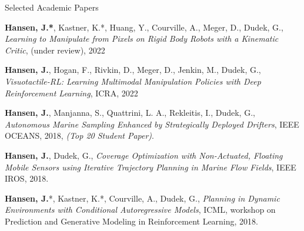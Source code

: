 \documentclass{resume} %
\begin{document}
 \begin{rSection}{Selected Academic Papers}

\textbf{Hansen, J.*}, Kastner, K.*, Huang, Y., Courville, A., Meger, D., Dudek, G., \textit{Learning to Manipulate from Pixels on Rigid Body Robots with a Kinematic Critic}, (under review), 2022

\textbf{Hansen, J.}, Hogan, F., Rivkin, D., Meger, D., Jenkin, M., Dudek, G., \textit{Visuotactile-RL: Learning Multimodal Manipulation Policies with Deep Reinforcement Learning}, ICRA, 2022


\textbf{Hansen, J.}, Manjanna, S.,  Quattrini, L. A., Rekleitis, I., Dudek, G., \textit{Autonomous Marine Sampling Enhanced by Strategically Deployed Drifters}, IEEE OCEANS, 2018, \emph{{(Top 20 Student Paper)}}.

\textbf{Hansen, J.}, Dudek, G., \textit{Coverage Optimization with Non-Actuated, Floating Mobile Sensors using Iterative Trajectory Planning in Marine Flow Fields}, IEEE IROS, 2018.

\textbf{Hansen, J.}*, Kastner, K.*, Courville, A., Dudek, G.,  \textit{Planning in Dynamic Environments with Conditional Autoregressive Models}, ICML, workshop on Prediction and Generative Modeling in Reinforcement Learning, 2018.


\end{rSection}
\end{document}
